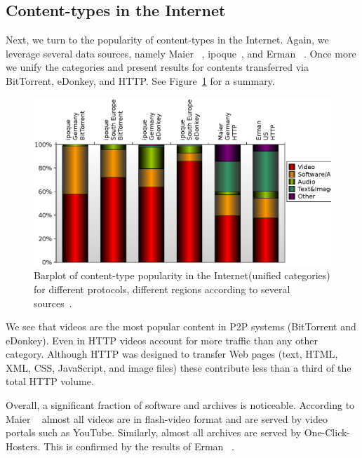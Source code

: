 \subsection{Content-types in the Internet}\label{sec:related:ctypes}

Next, we turn to the popularity of content-types in the Internet. Again, we
leverage several data sources, namely Maier
\etal~\cite{OnDominantCharacteristics2009}, ipoque~\cite{ipoque09}, and Erman
\etal~\cite{network-caching}. Once more we unify the categories and present
results for contents transferred via BitTorrent, eDonkey, and HTTP. See
Figure~\ref{fig:related:ctypes} for a summary.

\begin{figure}[tbp]
\centering
\includegraphics[width=0.95\linewidth]{figures/ctypes.eps}
\renewcommand{\capname}{Barplot of content-type popularity in the
Internet\xspace}
\caption[\capname]{\capname (unified categories) for
different protocols, different regions according to several
sources~\cite{OnDominantCharacteristics2009,ipoque09,network-caching}.}
\label{fig:related:ctypes}
\end{figure}

We see that videos are the most popular content in P2P systems (BitTorrent and
eDonkey). Even in HTTP videos account for more traffic than any other category.
Although HTTP was designed to transfer Web pages (text, \eg HTML, XML, CSS,
JavaScript, and image files) these contribute less than a third of the total
HTTP volume.

Overall, a significant fraction of software and archives is noticeable.
According to Maier \etal~\cite{OnDominantCharacteristics2009} almost all videos
are in flash-video format and are served by video portals such as YouTube.
Similarly, almost all archives are served by One-Click-Hosters. This is
confirmed by the results of Erman \etal~\cite{network-caching}.

